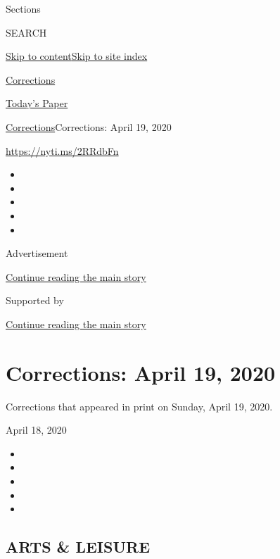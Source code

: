 Sections

SEARCH

\protect\hyperlink{site-content}{Skip to
content}\protect\hyperlink{site-index}{Skip to site index}

\href{https://www.nytimes3xbfgragh.onion/section/corrections}{Corrections}

\href{https://myaccount.nytimes3xbfgragh.onion/auth/login?response_type=cookie\&client_id=vi}{}

\href{https://www.nytimes3xbfgragh.onion/section/todayspaper}{Today's
Paper}

\href{/section/corrections}{Corrections}\textbar{}Corrections: April 19,
2020

\url{https://nyti.ms/2RRdbFn}

\begin{itemize}
\item
\item
\item
\item
\item
\end{itemize}

Advertisement

\protect\hyperlink{after-top}{Continue reading the main story}

Supported by

\protect\hyperlink{after-sponsor}{Continue reading the main story}

\hypertarget{corrections-april-19-2020}{%
\section{Corrections: April 19, 2020}\label{corrections-april-19-2020}}

Corrections that appeared in print on Sunday, April 19, 2020.

April 18, 2020

\begin{itemize}
\item
\item
\item
\item
\item
\end{itemize}

\hypertarget{arts--leisure}{%
\subsection{ARTS \& LEISURE}\label{arts--leisure}}

